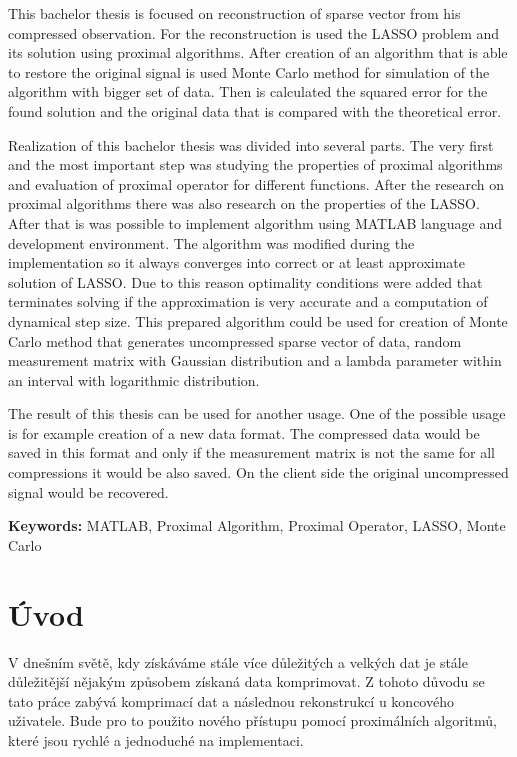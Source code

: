 \documentclass[FM,BP]{tulthesis}
\begin{document}
\vspace{2cm}
\begin{abstractEN}
This bachelor thesis is focused on reconstruction of sparse vector from his compressed observation. For the reconstruction is used the LASSO problem and its solution using proximal algorithms. After creation of an algorithm that is able to restore the original signal is used Monte Carlo method for simulation of the algorithm with bigger set of data. Then is calculated the squared error for the found solution and the original data that is compared with the theoretical error.


Realization of this bachelor thesis was divided into several parts. The very first and the most important step was studying the properties of proximal algorithms and evaluation of proximal operator for different functions. After the research on proximal algorithms there was also research on the properties of the LASSO. After that is was possible to implement algorithm using MATLAB language and development environment. The algorithm was modified during the implementation so it always converges into correct or at least approximate solution of LASSO. Due to this reason optimality conditions were added that terminates solving if the approximation is very accurate and a computation of dynamical step size. This prepared algorithm could be used for creation of Monte Carlo method that generates uncompressed sparse vector of data, random measurement matrix with Gaussian distribution and a lambda parameter within an interval with logarithmic distribution.


The result of this thesis can be used for another usage. One of the possible usage is for example creation of a new data format. The compressed data would be saved in this format and only if the measurement matrix is not the same for all compressions it would be also saved. On the client side the original uncompressed signal would be recovered.


\textbf{Keywords:} MATLAB, Proximal Algorithm, Proximal Operator, LASSO, Monte Carlo
\end{abstractEN}
\clearpage
\tableofcontents
\listoffigures
\listoftables
\pagebreak

\renewcommand{\baselinestretch}{1.5}
\setlength\parindent{1.2cm}
\selectfont

\chapter{Úvod}
\label{ch:uvod}
V dnešním světě, kdy získáváme stále více důležitých a velkých dat je stále důležitější nějakým způsobem získaná data komprimovat. Z tohoto důvodu se tato práce zabývá komprimací dat a následnou rekonstrukcí u koncového uživatele. Bude pro to použito nového přístupu pomocí proximálních algoritmů, které jsou rychlé a jednoduché na implementaci.
\end{document}
